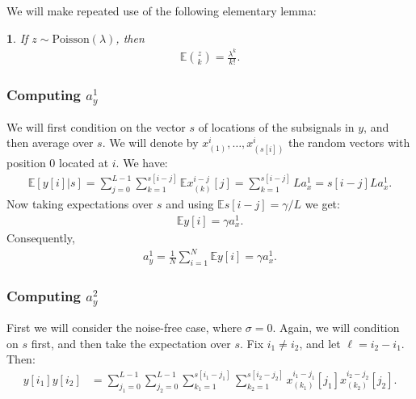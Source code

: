 \documentclass[12pt]{article}
\newcommand{\E}{\mathbb{E}}
\newcommand{\1}{\mathbf{1}}
\newcommand{\Poisson}{\text{Poisson}}
\theoremstyle{plain}
\theoremstyle{definition}
\theoremstyle{remark}
\theoremstyle{plain}
\newtheorem{lem}[thm]{\protect\lemmaname}
\theoremstyle{remark}
\theoremstyle{plain}
\theoremstyle{plain}
\theoremstyle{plain}
\providecommand{\lemmaname}{Lemma}
\numberwithin{equation}{section}
\begin{document}
We will make repeated use of the following elementary lemma:
%
\begin{lem} \label{lem-choose}
	If $z \sim \Poisson(\lambda)$, then 
	\begin{align}
	\E {z\choose k} = \frac{\lambda^k}{k!}.
	\end{align}
\end{lem}


%



\subsubsection{Computing $a_y^1$}

We will first condition on the vector $s$ of locations of the subsignals in $y$, and then average over $s$. We will denote by $x_{(1)}^i,\dots,x_{(s[i])}^i$ the random vectors with position 0 located at $i$. We have:
%
\begin{align}
%
\E[ y[i] | s ] = \sum_{j=0}^{L-1} \sum_{k=1}^{s[i-j]} \E x_{(k)}^{i-j}[j]
= \sum_{k=1}^{s[i-j]} L a_x^1
= s[i-j] L a_x^1.
%
\end{align}
%
Now taking expectations over $s$ and using $\E s[i-j] = \gamma/L$ we get:
%
\begin{align}
%
\E y[i] = \gamma a_x^1.
%
\end{align}
%
Consequently,
%
\begin{align}
a_y^1 = \frac{1}{N} \sum_{i=1}^N \E y[i] = \gamma a_x^1.
\end{align}


%


\subsubsection{Computing $a_y^2$}

First we will consider the noise-free case, where $\sigma = 0$. 
Again, we will condition on $s$ first, and then take the expectation over $s$. Fix $i_1 \ne i_2$, and let $\ell = i_2 - i_1$. Then:
%
\begin{align}
%
y[i_1] y[i_2]
&= \sum_{j_1=0}^{L-1} \sum_{j_2=0}^{L-1} 
\sum_{k_1=1}^{s[i_1-j_1]}\sum_{k_2=1}^{s[i_2-j_2]}
x_{(k_1)}^{i_1-j_1}[j_1] x_{(k_2)}^{i_2 - j_2}[j_2].
%
\end{align}
\end{document}

